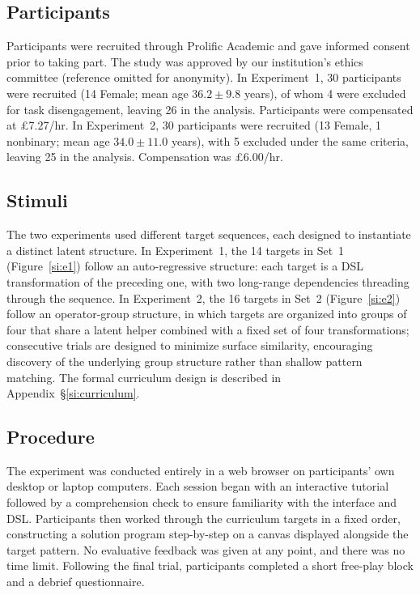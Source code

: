 \documentclass{article}
\begin{document}
\subsection{Participants}
Participants were recruited through Prolific Academic and gave informed consent prior to taking part. The study was approved by our institution's ethics committee (reference omitted for anonymity).
In Experiment~1, 30 participants were recruited (14 Female; mean age $36.2 \pm 9.8$ years), of whom 4 were excluded for task disengagement, leaving 26 in the analysis. Participants were compensated at \pounds7.27/hr. In Experiment~2, 30 participants were recruited (13 Female, 1 nonbinary; mean age $34.0 \pm 11.0$ years), with 5 excluded under the same criteria, leaving 25 in the analysis. Compensation was \pounds6.00/hr.

\subsection{Stimuli}
The two experiments used different target sequences, each designed to instantiate a distinct latent structure. In Experiment~1, the 14 targets in Set~1 (Figure~\ref{si:e1}) follow an auto-regressive structure: each target is a DSL transformation of the preceding one, with two long-range dependencies threading through the sequence. In Experiment~2, the 16 targets in Set~2 (Figure~\ref{si:e2}) follow an operator-group structure, in which targets are organized into groups of four that share a latent helper combined with a fixed set of four transformations; consecutive trials are designed to minimize surface similarity, encouraging discovery of the underlying group structure rather than shallow pattern matching. The formal curriculum design is described in Appendix~\S\ref{si:curriculum}.

\subsection{Procedure}
The experiment was conducted entirely in a web browser on participants' own desktop or laptop computers. Each session began with an interactive tutorial followed by a comprehension check to ensure familiarity with the interface and DSL. Participants then worked through the curriculum targets in a fixed order, constructing a solution program step-by-step on a canvas displayed alongside the target pattern. No evaluative feedback was given at any point, and there was no time limit. Following the final trial, participants completed a short free-play block and a debrief questionnaire. %
\end{document}
